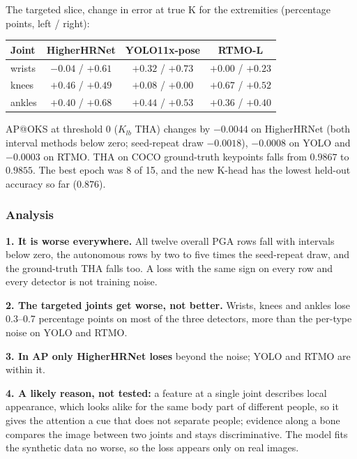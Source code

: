 \vspace{0.5em}

The targeted slice, change in error at true K for the extremities (percentage points, left / right):

{\small
\begin{tabular}{lccc}
\hline
\textbf{Joint} & \textbf{HigherHRNet} & \textbf{YOLO11x-pose} & \textbf{RTMO-L} \\
\hline
wrists & $-0.04$ / $+0.61$ & $+0.32$ / $+0.73$ & $+0.00$ / $+0.23$ \\
knees  & $+0.46$ / $+0.49$ & $+0.08$ / $+0.00$ & $+0.67$ / $+0.52$ \\
ankles & $+0.40$ / $+0.68$ & $+0.44$ / $+0.53$ & $+0.36$ / $+0.40$ \\
\hline
\end{tabular}
}

\vspace{0.5em}

AP@OKS at threshold 0 ($K_{lb}$ THA) changes by $-0.0044$ on HigherHRNet (both interval methods below zero; seed-repeat draw $-0.0018$), $-0.0008$ on YOLO and $-0.0003$ on RTMO.
THA on COCO ground-truth keypoints falls from $0.9867$ to $0.9855$.
The best epoch was 8 of 15, and the new K-head has the lowest held-out accuracy so far ($0.876$).

\subsubsection{Analysis}

\textbf{1. It is worse everywhere.} All twelve overall PGA rows fall with intervals below zero, the autonomous rows by two to five times the seed-repeat draw, and the ground-truth THA falls too. A loss with the same sign on every row and every detector is not training noise.

\textbf{2. The targeted joints get worse, not better.} Wrists, knees and ankles lose 0.3--0.7 percentage points on most of the three detectors, more than the per-type noise on YOLO and RTMO.

\textbf{3. In AP only HigherHRNet loses} beyond the noise; YOLO and RTMO are within it.

\textbf{4. A likely reason, not tested:} a feature at a single joint describes local appearance, which looks alike for the same body part of different people, so it gives the attention a cue that does not separate people; evidence along a bone compares the image between two joints and stays discriminative. The model fits the synthetic data no worse, so the loss appears only on real images.

